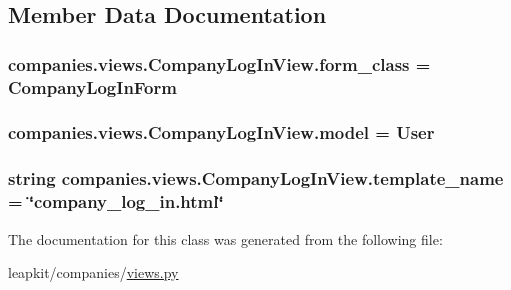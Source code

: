 \subsection{Member Data Documentation}
\hypertarget{classcompanies_1_1views_1_1_company_log_in_view_a5e51ffcef3fc128a539a000e7cfdba99}{
\subsubsection[{form\-\_\-class}]{\setlength{\rightskip}{0pt plus 5cm}companies.\-views.\-Company\-Log\-In\-View.\-form\-\_\-class = Company\-Log\-In\-Form\hspace{0.3cm}{\ttfamily [static]}}}\label{classcompanies_1_1views_1_1_company_log_in_view_a5e51ffcef3fc128a539a000e7cfdba99}
\hypertarget{classcompanies_1_1views_1_1_company_log_in_view_ad091f9304db7e7e99fbc2873c48a308b}{
\subsubsection[{model}]{\setlength{\rightskip}{0pt plus 5cm}companies.\-views.\-Company\-Log\-In\-View.\-model = User\hspace{0.3cm}{\ttfamily [static]}}}\label{classcompanies_1_1views_1_1_company_log_in_view_ad091f9304db7e7e99fbc2873c48a308b}
\hypertarget{classcompanies_1_1views_1_1_company_log_in_view_a6f2153bb78773904a49c0b97853d54f6}{
\subsubsection[{template\-\_\-name}]{\setlength{\rightskip}{0pt plus 5cm}string companies.\-views.\-Company\-Log\-In\-View.\-template\-\_\-name = \char`\"{}company\-\_\-log\-\_\-in.\-html\char`\"{}\hspace{0.3cm}{\ttfamily [static]}}}\label{classcompanies_1_1views_1_1_company_log_in_view_a6f2153bb78773904a49c0b97853d54f6}


The documentation for this class was generated from the following file\-:\begin{DoxyCompactItemize}
\item 
leapkit/companies/\hyperlink{companies_2views_8py}{views.\-py}\end{DoxyCompactItemize}
